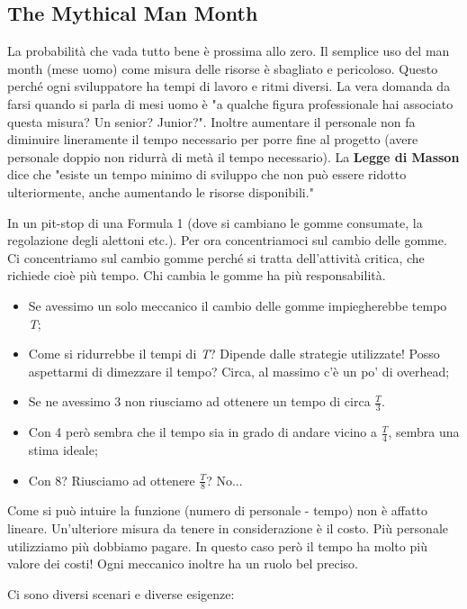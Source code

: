\subsection{The Mythical Man Month}
La probabilità che vada tutto bene è prossima allo zero.
Il semplice uso del man month (mese uomo) come misura delle risorse è sbagliato e pericoloso. Questo perché ogni sviluppatore ha tempi di lavoro e ritmi diversi. La vera domanda da farsi quando si parla di mesi uomo è "a qualche figura professionale hai associato questa misura? Un senior? Junior?".
Inoltre aumentare il personale non fa diminuire lineramente il tempo necessario per porre fine al progetto (avere personale doppio non ridurrà di metà il tempo necessario).\newline
La \textbf{Legge di Masson} dice che "esiste un tempo minimo di sviluppo che non può essere ridotto ulteriormente, anche aumentando le risorse disponibili."
\begin{info}[Esempio]
	In un pit-stop di una Formula 1 (dove si cambiano le gomme consumate, la regolazione degli alettoni etc.). Per ora concentriamoci sul cambio delle gomme. Ci concentriamo sul cambio gomme perché si tratta dell'attività critica, che richiede cioè più tempo. Chi cambia le gomme ha più responsabilità.
	\begin{itemize}
		\item Se avessimo un solo meccanico il cambio delle gomme impiegherebbe tempo \textit{T};
		\item Come si ridurrebbe il tempi di \textit{T}? Dipende dalle strategie utilizzate! Posso aspettarmi di dimezzare il tempo? Circa, al massimo c'è un po' di overhead;
		\item Se ne avessimo 3 non riusciamo ad ottenere un tempo di circa $\frac{T}{3}$.
		\item Con 4 però sembra che il tempo sia in grado di andare vicino a $\frac{T}{4}$, sembra una stima ideale;
		\item Con 8? Riusciamo ad ottenere $\frac{T}{8}$? No...
	\end{itemize}
	Come si può intuire la funzione (numero di personale - tempo) non è affatto lineare.
	Un'ulteriore misura da tenere in considerazione è il costo. Più personale utilizziamo più dobbiamo pagare.\newline
	In questo caso però il tempo ha molto più valore dei costi!\newline
	Ogni meccanico inoltre ha un ruolo bel preciso.
\end{info}
Ci sono diversi scenari e diverse esigenze:
